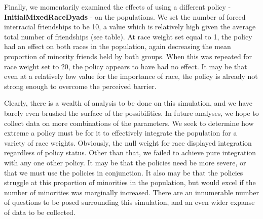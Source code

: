 Finally, we momentarily examined the effects of using a different policy -{\bf InitialMixedRaceDyads} - on the 
populations. We set the number of forced interracial friendships to be 10, a value which is relatively high given the average total number of friendships (see table). At race weight 
set equal to 1, the policy had an effect on both races in the population, again decreasing the mean proportion of minority friends held by both groups. When this was repeated for race 
weight set to 20, the policy appears to have had no effect. It may be that even at a relatively low value for the importance of race, the policy is already not strong enough to overcome 
the perceived barrier.

Clearly, there is a wealth of analysis to be done on this simulation, and we have barely even brushed the surface of the 
possibilities. In future analyses, we hope to collect data on more combinations of the parameters. We seek to determine how 
extreme a policy must be for it to effectively integrate the population for a variety of race weights. Obviously, the null 
weight for race displayed integration regardless of policy status. Other than that, we failed to achieve pure integration 
with any one other policy. It may be that the policies need be more severe, or that we must use the policies in 
conjunction. It also may be that the policies struggle at this proportion of minorities in the population, but would 
excel if the number of minorities was marginally increased. There are an innumerable number of questions to be posed 
surrounding this simulation, and an even wider expanse of data to be collected.
